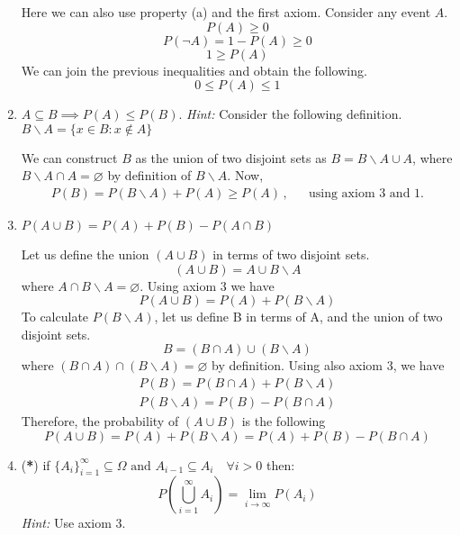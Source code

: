 \begin{enumerate}[label=\alph*.]
Here we can also use property (a) and the first axiom. Consider any event $A$.
\[
P(A) \geq 0
\]
\[
P(\neg A) = 1 - P(A) \geq 0
\]
\[
1 \geq P(A)
\]
We can join the previous inequalities and obtain the following.
\[
0 \leq P(A) \leq 1
\]
    \item $A \subseteq B \implies P(A) \leq P(B)$. \textit{Hint:} Consider the following definition. $B\backslash  A = \{x\in B: x\notin A\}$

We can construct $B$ as the union of two disjoint sets as $B = B\backslash A \cup A$, 
where $B\backslash A \cap A = \varnothing$ by definition of $B\backslash A$. Now,
\begin{align}
P(B) = P(B\backslash A) + P(A) \geq P(A) \,, && \text{using axiom 3 and 1.}
\end{align}
    \item $P(A\cup B) = P(A) + P(B) - P(A\cap B)$

Let us define the union $(A\cup B)$ in terms of two disjoint sets.
\[
(A \cup B) = A \cup B\backslash A
\]
where $A \cap B\backslash A = \varnothing$. Using axiom 3 we have
\[
P(A \cup B) = P(A) + P(B\backslash A)
\]
To calculate $P(B\backslash A)$, let us define B in terms of A, and the union of two disjoint sets.
\[
B = (B \cap A) \cup (B\backslash A)
\]
where $(B \cap A) \cap (B\backslash A) = \varnothing$ by definition. Using also axiom 3, we have
\begin{align}
P(B) = P(B \cap A) + P(B\backslash A) \\
P(B\backslash A) = P(B) - P(B \cap A)
\end{align}
Therefore, the probability of $(A \cup B)$ is the following
\[
P(A \cup B) = P(A) + P(B\backslash A) = P(A) + P(B) - P(B \cap A)
\]
    \item (\textbf{*}) if $\{A_i\}_{i=1}^\infty \subseteq \Omega \text{ and } A_{i-1} \subseteq A_{i}\quad \forall i>0$ then:
\[
P\left(\bigcup_{i=1}^{\infty} A_{i}\right) = \lim_{i\xrightarrow{}\infty} P(A_i)
\]
\textit{Hint:} Use axiom 3.


\end{enumerate}

